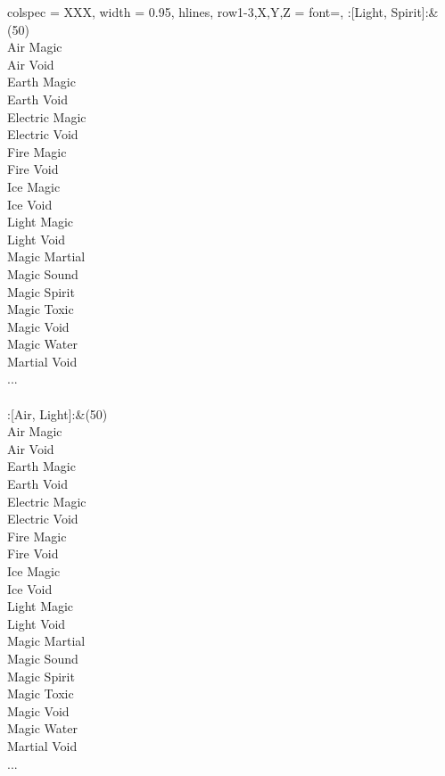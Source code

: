 \begin{longtblr}[
	caption = {2v2 Defending Weak},
	label = {2v2-Defending-Weak},
]{
	colspec = {XXX}, width = 0.95\linewidth,
	hlines,
	row{1-3,X,Y,Z} = {font=\bfseries},
}
	:[Light, Spirit]:&{(50)\\
	Air Magic \\
	Air Void \\
	Earth Magic \\
	Earth Void \\
	Electric Magic \\
	Electric Void \\
	Fire Magic \\
	Fire Void \\
	Ice Magic \\
	Ice Void \\
	Light Magic \\
	Light Void \\
	Magic Martial \\
	Magic Sound \\
	Magic Spirit \\
	Magic Toxic \\
	Magic Void \\
	Magic Water \\
	Martial Void \\
	...\\
	}\\

	:[Air, Light]:&{(50)\\
	Air Magic \\
	Air Void \\
	Earth Magic \\
	Earth Void \\
	Electric Magic \\
	Electric Void \\
	Fire Magic \\
	Fire Void \\
	Ice Magic \\
	Ice Void \\
	Light Magic \\
	Light Void \\
	Magic Martial \\
	Magic Sound \\
	Magic Spirit \\
	Magic Toxic \\
	Magic Void \\
	Magic Water \\
	Martial Void \\
	...\\
	}\\


\end{longtblr}
